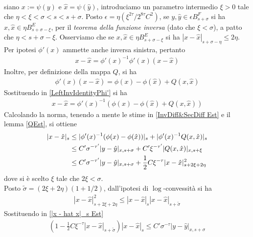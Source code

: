 \documentclass[twoside, 11pt]{amsbook}
\makeatletter
\newcommand{\0}{{(0)}}
\newcommand{\3}{{(3)}}
\theoremstyle{colonplain}
\theoremstyle{colondefinition}
\theoremstyle{colonremark}
\numberwithin{equation}{chapter}
\renewcommand{\proofname}{Dimostrazione}
\renewenvironment{proof}[1][\proofname]{\par
  \pushQED{\qed}%
  \normalfont \topsep6\p@\@plus6\p@\relax
  \trivlist
  \item[\hskip\labelsep\bfseries #1:]\ignorespaces
}{%
  \popQED\endtrivlist\@endpefalse
}
\makeatother
\begin{document}
\begin{proof} siano $x := \psi(y)$ e $\hat{x} = \psi(\hat{y})$, introduciamo un parametro intermedio $\xi > 0$ tale che $\eta < \xi < \sigma < s < s + \sigma$. Posto $\epsilon = \eta(\xi^{2\tau}/2^{8\tau}C^2)$, se $y, \hat{y} \in \epsilon B^F_{s + \sigma}$ si ha $x, \hat{x} \in \eta B^E_{s + \sigma - \xi}$, per il \textit{teorema della funzione inversa} (dato che $\xi < \sigma$), a patto che $\eta < s + \sigma - \xi$. Osserviamo che se $x, \hat{x} \in \eta B^E_{s + \sigma - \xi}$ si ha $|x - \hat{x}|_{s + \sigma - \eta} \leq 2\eta$. \\
Per ipotesi $\phi'(x)$ ammette anche inversa sinistra, pertanto
\begin{align}\label{LeftInvIdentityPhi'}
    x - \hat{x} = \phi'(x)^{-1}\phi'(x)(x - \hat{x}) 
\end{align}
Inoltre, per definizione della mappa $Q$, si ha
\begin{align}
    \phi'(x)(x - \hat{x}) = \phi(x) - \phi(\hat{x}) + Q(x, \hat{x}) 
\end{align}
Sostituendo in \eqref{LeftInvIdentityPhi'} si ha
\begin{align}
    x - \hat{x} = \phi'(x)^{-1}(\phi(x) - \phi(\hat{x}) + Q(x, \hat{x})) 
\end{align}
Calcolando la norma, tenendo a mente le stime in \eqref{InvDiff&SecDiff Est} e il lemma \ref{QEst}, si ottiene
\begin{align}
    |x - \hat{x}|_s &\leq |\phi'(x)^{-1}(\phi(x) - \phi(\hat{x}))|_s + |\phi'(x)^{-1}Q(x, \hat{x})|_s \notag \\
    &\leq C'\sigma^{-\tau'}|y - \hat{y}|_{x, s + \sigma} + C'\xi^{-\tau'}|Q(x, \hat{x})|_{x, s + \xi} \notag \\
    \label{|x - hat x|_s Est}
    &\leq C'\sigma^{-\tau'}|y - \hat{y}|_{x, s + \sigma} + \frac{1}{2}C\xi^{-\tau}|x - \hat{x}|^2_{s + 2\xi + 2\eta} 
\end{align}
dove si è scelto $\xi$ tale che $2\xi < \sigma$. \\
Posto $\widetilde{\sigma} = (2\xi + 2\eta)(1 + 1/2)$, dall'ipotesi di $\log$-convessità si ha
\begin{align}
    |x - \hat{x}|^2_{s + 2\xi + 2\eta} \leq |x - \hat{x}|_s|x - \hat{x}|_{s + \widetilde{\sigma}} 
\end{align}
Sostituendo in \eqref{|x - hat x|_s Est}
\begin{align}
    \left(1 - \frac{1}{2}C\xi^{-\tau}|x - \hat{x}|_{s + \widetilde{\sigma}}\right)|x - \hat{x}|_{s} \leq C'\sigma^{-\tau}|y - \hat{y}|_{x, s + \sigma} 

\end{align}
\end{proof}
\end{document}

